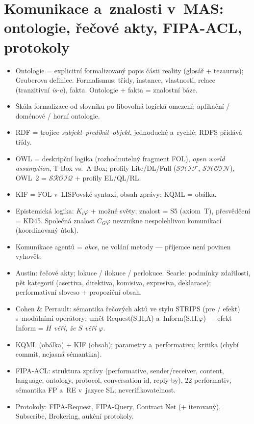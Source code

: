 \documentclass[11pt,a4paper]{article}
\theoremstyle{definition}
\begin{document}
\section{Komunikace a~znalosti v~MAS: ontologie, řečové akty, FIPA-ACL, protokoly}
\begin{itemize}
\item Ontologie = explicitní formalizovaný popis části reality (glosář + tezaurus);
 Gruberova definice. Formalismus: třídy, instance, vlastnosti, relace (tranzitivní
 \emph{is-a}), fakta. Ontologie + fakta = znalostní báze.
\item Škála formalizace od slovníku po libovolná logická omezení; aplikační / doménové /
 horní ontologie.
\item RDF = trojice \emph{subjekt--predikát--objekt}, jednoduché a~rychlé; RDFS přidává třídy.
\item OWL = deskripční logika (rozhodnutelný fragment FOL), \emph{open world assumption},
 T-Box vs.\ A-Box; profily Lite/DL/Full ($\mathcal{SHIF}$, $\mathcal{SHOIN}$),
 OWL~2 = $\mathcal{SROIQ}$ + profily EL/QL/RL.
\item KIF = FOL v~LISPovské syntaxi, obsah zprávy; KQML = obálka.
\item Epistemická logika: $K_i\varphi$ + možné světy; znalost = S5 (axiom~T), přesvědčení
 = KD45. Společná znalost $C_G\varphi$ nevznikne nespolehlivou komunikací (koordinovaný útok).
\item Komunikace agentů = \emph{akce}, ne volání metody --- příjemce není povinen vyhovět.
\item Austin: řečové akty; lokuce / ilokuce / perlokuce. Searle: podmínky zdařilosti,
 pět kategorií (asertiva, direktiva, komisiva, expresiva, deklarace); performativní sloveso
 + propoziční obsah.
\item Cohen \& Perrault: sémantika řečových aktů ve stylu STRIPS (pre / efekt) s~modálními
 operátory; umět Request(S,H,A) a~Inform(S,H,$\varphi$) --- efekt Inform =
 \emph{$H$ věří, že $S$ věří $\varphi$}.
\item KQML (obálka) + KIF (obsah); parametry a~performativa; kritika (chybí commit, nejasná
 sémantika).
\item FIPA-ACL: struktura zprávy (performative, sender/receiver, content, language, ontology,
 protocol, conversation-id, reply-by), 22 performativ, sémantika FP a~RE v~jazyce SL;
 neverifikovatelnost.
\item Protokoly: FIPA-Request, FIPA-Query, Contract Net (+ iterovaný), Subscribe, Brokering,
 aukční protokoly.
\end{itemize}
\end{document}
